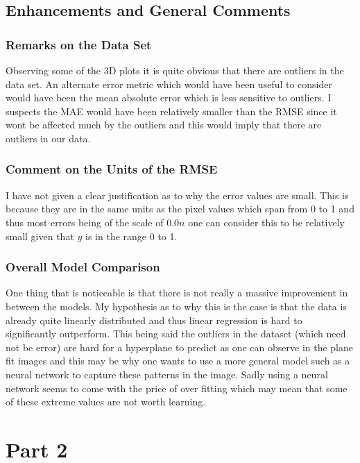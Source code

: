 \documentclass[11pt]{article}
\begin{document}
\subsection{Enhancements and General Comments}

\subsubsection{Remarks on the Data Set}

  Observing some of the 3D plots it is quite obvious that there are outliers in the data set. An alternate error metric which would have been useful to consider would have been the mean absolute error which is less sensitive to outliers. I suspects the MAE would have been relatively smaller than the RMSE since it wont be affected much by the outliers and this would imply that there are outliers in our data.
  
\subsubsection{Comment on the Units of the RMSE}

I have not given a clear justification as to why the error values are small. This is because they are in the same units as the pixel values which span from 0 to 1 and thus most errors being of the scale of $0.0n$ one can consider this to be relatively small given that $y$ is in the range 0 to 1.

\subsubsection{Overall Model Comparison}

One thing that is noticeable is that there is not really a massive improvement in between the models. My hypothesis as to why this is the case is that the data is already quite linearly distributed and thus linear regression is hard to significantly outperform. This being said the outliers in the dataset (which need not be error) are hard for a hyperplane to predict as one can observe in the plane fit images and this may be why one wants to use a more general model such as a neural network to capture these patterns in the image. Sadly using a neural network seems to come with the price of over fitting which may mean that some of these extreme values are not worth learning.



\section{Part 2}
\end{document}
